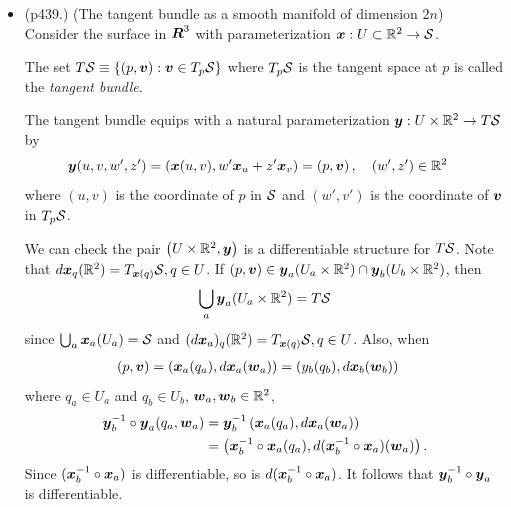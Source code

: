 \documentclass[11pt]{article}
\begin{document}
\begin{itemize}
\newpage
\item \begin{example}\citep{do1976differential} (p439.)
(The tangent bundle as a smooth manifold of dimension $2n$) \\
Consider the surface in $\boldsymbol{R}^{3}$ with parameterization $\boldsymbol{x}: U \subset {\mathbb R}^{2}\rightarrow {\mathcal S}$. \begin{definition}The set $T{\mathcal S} \equiv \left\{(p, \boldsymbol{v}): \boldsymbol{v}\in T_{p}{\mathcal S}\right\}$ where $T_{p}{\mathcal S}$ is the tangent space at $p$ is called the \emph{tangent bundle}.  \end{definition}

The tangent bundle equips with a natural parameterization  $\boldsymbol{y}: U \times {\mathbb R}^{2} \rightarrow T{\mathcal S}$ by 
\begin{align*}
\boldsymbol{y}(u, v, w', z') &= \left(\boldsymbol{x}(u,v),  w'\boldsymbol{x}_{u} + z'\boldsymbol{x}_{v}\right)  = \left(p, \boldsymbol{v}\right),\quad (w',z')\in {\mathbb R}^{2}
\end{align*} 
where $(u,v)$ is the coordinate of $p$ in ${\mathcal S}$ and $(w',v')$ is the coordinate of $\boldsymbol{v}$ in $T_{p}{\mathcal S}$.  

We can check the pair $\left( U \times {\mathbb R}^{2},  \boldsymbol{y}\right)$ is a differentiable structure for $T{\mathcal S}$. Note that $d\boldsymbol{x}_{q}({\mathbb R}^{2}) = T_{\boldsymbol{x}(q)}{\mathcal S}, q\in U$. If $(p, \boldsymbol{v}) \in \boldsymbol{y}_{a}(U_{a}\times {\mathbb R}^{2}) \cap \boldsymbol{y}_{b}(U_{b}\times {\mathbb R}^{2}) $, then
\begin{align*}
\bigcup_{a}\boldsymbol{y}_{a}(U_{a}\times {\mathbb R}^{2}) = T{\mathcal S}
\end{align*}
since $\bigcup_{a}\boldsymbol{x}_{a}(U_{a}) = {\mathcal S}$ and $(d\boldsymbol{x}_{a})_{q}({\mathbb R}^{2}) = T_{\boldsymbol{x}(q)}{\mathcal S}, q\in U$.
Also, when
\begin{align*}
(p, \boldsymbol{v})  &= (\boldsymbol{x}_{a}(q_{a}),  d\boldsymbol{x}_{a}(\boldsymbol{w}_{a})) = (y_{b}(q_{b}), d\boldsymbol{x}_{b}(\boldsymbol{w}_{b}))
\end{align*}
where $q_{a}\in U_{a}$ and $q_{b}\in U_{b}$, $\boldsymbol{w}_{a}, \boldsymbol{w}_{b}\in {\mathbb R}^{2}$,  
\begin{align*}
\boldsymbol{y}_{b}^{-1}\circ \boldsymbol{y}_{a}(q_{a}, \boldsymbol{w}_{a}) &= \boldsymbol{y}_{b}^{-1}\left(\boldsymbol{x}_{a}(q_{a}),  d\boldsymbol{x}_{a}(\boldsymbol{w}_{a})\right)\\
&= \left( \boldsymbol{x}_{b}^{-1}\circ\boldsymbol{x}_{a}(q_{a}), d(\boldsymbol{x}_{b}^{-1}\circ \boldsymbol{x}_{a})(\boldsymbol{w}_{a})  \right).
\end{align*}
Since $(\boldsymbol{x}_{b}^{-1}\circ\boldsymbol{x}_{a})$ is differentiable, so is $d(\boldsymbol{x}_{b}^{-1}\circ\boldsymbol{x}_{a})$. It follows that $\boldsymbol{y}_{b}^{-1}\circ \boldsymbol{y}_{a}$ is differentiable. 


\end{example}
\end{itemize}
\end{document}
